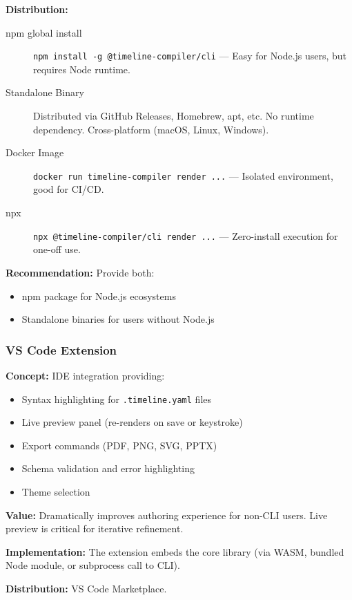\textbf{Distribution:}
\begin{description}
  \item[npm global install] \texttt{npm install -g @timeline-compiler/cli} — Easy for Node.js users, but requires Node runtime.
  
  \item[Standalone Binary] Distributed via GitHub Releases, Homebrew, apt, etc. No runtime dependency. Cross-platform (macOS, Linux, Windows).
  
  \item[Docker Image] \texttt{docker run timeline-compiler render ...} — Isolated environment, good for CI/CD.
  
  \item[npx] \texttt{npx @timeline-compiler/cli render ...} — Zero-install execution for one-off use.
\end{description}

\textbf{Recommendation:} Provide both:
\begin{itemize}
  \item npm package for Node.js ecosystems
  \item Standalone binaries for users without Node.js
\end{itemize}

\subsubsection{VS Code Extension}

\textbf{Concept:} IDE integration providing:
\begin{itemize}
  \item Syntax highlighting for \texttt{.timeline.yaml} files
  \item Live preview panel (re-renders on save or keystroke)
  \item Export commands (PDF, PNG, SVG, PPTX)
  \item Schema validation and error highlighting
  \item Theme selection
\end{itemize}

\textbf{Value:} Dramatically improves authoring experience for non-CLI users. Live preview is critical for iterative refinement.

\textbf{Implementation:} The extension embeds the core library (via WASM, bundled Node module, or subprocess call to CLI).

\textbf{Distribution:} VS Code Marketplace.

